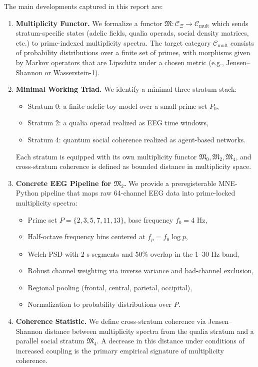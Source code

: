 \documentclass[11pt]{article}
\begin{document}
The main developments captured in this report are:

\begin{enumerate}[leftmargin=*]
  \item \textbf{Multiplicity Functor.} We formalize a functor \(\mathfrak{M} : \mathcal{C}_\Xi \to \mathcal{C}_{\mathrm{mult}}\) which sends stratum-specific states (adelic fields, qualia operads, social density matrices, etc.) to prime-indexed multiplicity spectra. The target category \(\mathcal{C}_{\mathrm{mult}}\) consists of probability distributions over a finite set of primes, with morphisms given by Markov operators that are Lipschitz under a chosen metric (e.g., Jensen--Shannon or Wasserstein-1).
  \item \textbf{Minimal Working Triad.} We identify a minimal three-stratum stack:
  \begin{itemize}
    \item Stratum 0: a finite adelic toy model over a small prime set \(P_0\),
    \item Stratum 2: a qualia operad realized as EEG time windows,
    \item Stratum 4: quantum social coherence realized as agent-based networks.
  \end{itemize}
  Each stratum is equipped with its own multiplicity functor \(\mathfrak{M}_0, \mathfrak{M}_2, \mathfrak{M}_4\), and cross-stratum coherence is defined as bounded distance in multiplicity space.
  \item \textbf{Concrete EEG Pipeline for \(\mathfrak{M}_2\).} We provide a preregisterable MNE-Python pipeline that maps raw 64-channel EEG data into prime-locked multiplicity spectra:
  \begin{itemize}
    \item Prime set \(P = \{2,3,5,7,11,13\}\), base frequency \(f_0 = 4 \text{ Hz}\),
    \item Half-octave frequency bins centered at \(f_p = f_0 \log p\),
    \item Welch PSD with 2 s segments and 50\% overlap in the 1--30 Hz band,
    \item Robust channel weighting via inverse variance and bad-channel exclusion,
    \item Regional pooling (frontal, central, parietal, occipital),
    \item Normalization to probability distributions over \(P\).
  \end{itemize}
  \item \textbf{Coherence Statistic.} We define cross-stratum coherence via Jensen--Shannon distance between multiplicity spectra from the qualia stratum and a parallel social stratum \(\mathfrak{M}_4\). A decrease in this distance under conditions of increased coupling is the primary empirical signature of multiplicity coherence.
\end{enumerate}
\end{document}
